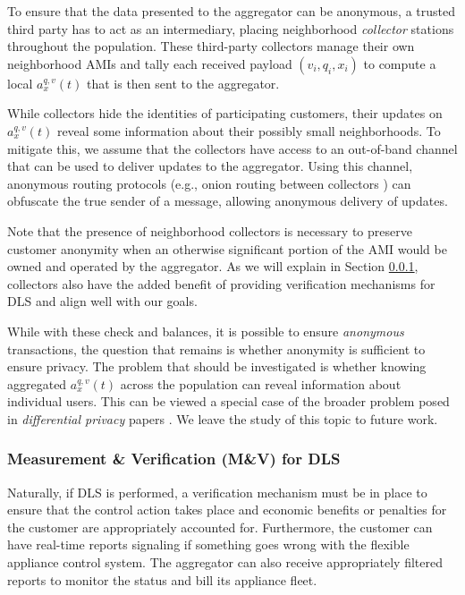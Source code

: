 \documentclass[10pt]{IEEEtran}
\begin{document}
To ensure that the data presented to the aggregator can be anonymous, a trusted third party has to act as an intermediary, placing neighborhood \emph{collector} stations throughout the population.  These third-party collectors manage their own neighborhood AMIs and tally each received payload $(v_i,q_i,x_i)$ to compute a local $a_{x}^{q,v}(t)$ that is then sent to the aggregator.

While collectors hide the identities of participating customers, their updates on $a_{x}^{q,v}(t)$ reveal some information about their possibly small neighborhoods.  To mitigate this, we assume that the collectors have access to an out-of-band channel that can be used to deliver updates to the aggregator.  Using this channel, anonymous routing protocols (e.g., onion routing between collectors \cite{Dingledine2004TSO1251375.1251396}) can obfuscate the true sender of a message, allowing anonymous delivery of updates.

Note that the presence of neighborhood collectors is necessary to preserve customer anonymity when an otherwise significant portion of the AMI would be owned and operated by the aggregator.  As we will explain in Section \ref{sec.mv}, collectors also have the added benefit of providing verification mechanisms for DLS and align well with our goals.





 While with these check and balances, it is possible to ensure {\it anonymous} transactions, 
 the question that remains is whether anonymity is sufficient to ensure privacy. 
The problem that should be investigated is whether knowing aggregated $a_x^{q,v}(t)$ across the population can reveal information about individual users.  This can be viewed a special case  of the broader problem posed in {\it differential privacy} papers \cite{lalitha,diff2}. We leave the study of this topic to future work.


 

 

 

\subsubsection{Measurement \& Verification (M\&V) for DLS}\label{sec.mv}

Naturally, if DLS is performed, a verification mechanism must be in place to ensure that the control action takes place and economic benefits or penalties for the customer are appropriately accounted for.  Furthermore, the customer can have real-time reports signaling if something goes wrong with the flexible appliance control system. The aggregator can also receive appropriately filtered reports to monitor the status and bill its appliance fleet. 
\end{document}
